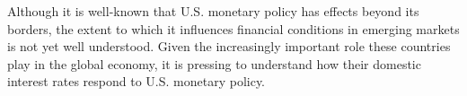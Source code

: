 Although it is well-known that U.S. monetary policy has effects beyond its borders, the extent to which it influences financial conditions in emerging markets is not yet well understood.
Given the increasingly important role these countries play in the global economy, it is pressing to understand how their domestic interest rates respond to U.S. monetary policy.




